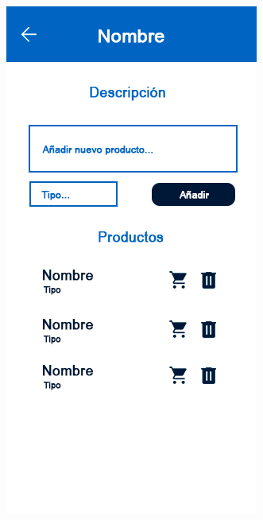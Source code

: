 \documentclass{article}
\begin{document}
\begin{figure}[htbp]
\begin{subfigure}[h]{0.3\textwidth}
    \end{subfigure}
    \hfill
    \begin{subfigure}[h]{0.3\textwidth}
        \includegraphics[width=\textwidth]{imagenes/modelos/detalles.png}

\end{subfigure}
\end{figure}
\end{document}
